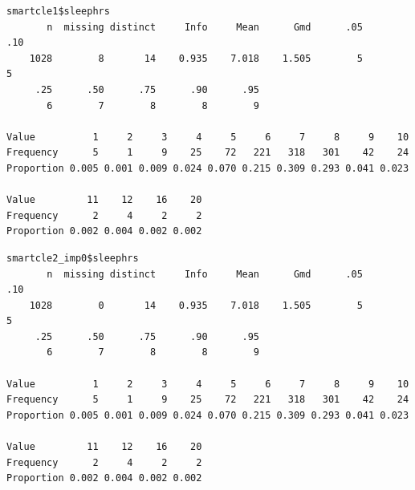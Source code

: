 \documentclass[]{book}
\newenvironment{Shaded}{\begin{snugshade}}{\end{snugshade}}
\newcommand{\KeywordTok}[1]{\textcolor[rgb]{0.13,0.29,0.53}{\textbf{#1}}}
\newcommand{\StringTok}[1]{\textcolor[rgb]{0.31,0.60,0.02}{#1}}
\newcommand{\OperatorTok}[1]{\textcolor[rgb]{0.81,0.36,0.00}{\textbf{#1}}}
\newcommand{\NormalTok}[1]{#1}
\theoremstyle{definition}
\theoremstyle{definition}
\theoremstyle{definition}
\theoremstyle{remark}
\begin{document}
\begin{verbatim}
smartcle1$sleephrs 
       n  missing distinct     Info     Mean      Gmd      .05      .10 
    1028        8       14    0.935    7.018    1.505        5        5 
     .25      .50      .75      .90      .95 
       6        7        8        8        9 
                                                                      
Value          1     2     3     4     5     6     7     8     9    10
Frequency      5     1     9    25    72   221   318   301    42    24
Proportion 0.005 0.001 0.009 0.024 0.070 0.215 0.309 0.293 0.041 0.023
                                  
Value         11    12    16    20
Frequency      2     4     2     2
Proportion 0.002 0.004 0.002 0.002
\end{verbatim}

\begin{Shaded}
\end{Shaded}

\begin{verbatim}
smartcle2_imp0$sleephrs 
       n  missing distinct     Info     Mean      Gmd      .05      .10 
    1028        0       14    0.935    7.018    1.505        5        5 
     .25      .50      .75      .90      .95 
       6        7        8        8        9 
                                                                      
Value          1     2     3     4     5     6     7     8     9    10
Frequency      5     1     9    25    72   221   318   301    42    24
Proportion 0.005 0.001 0.009 0.024 0.070 0.215 0.309 0.293 0.041 0.023
                                  
Value         11    12    16    20
Frequency      2     4     2     2
Proportion 0.002 0.004 0.002 0.002
\end{verbatim}
\end{document}
